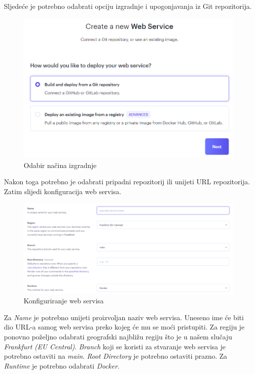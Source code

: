 			Sljedeće je potrebno odabrati opciju izgradnje i upogonjavanja iz Git repozitorija.
			
			\begin{figure}[H]
				\includegraphics[width=\textwidth]{slike/upute/odabirIzvoraIzgradnje.png} %
				\caption{Odabir načina izgradnje}
				\label{fig:odabirIzvoraIzgradnje} %
			\end{figure}
			
			Nakon toga potrebno je odabrati pripadni repozitorij ili unijeti URL repozitorija. Zatim slijedi konfiguracija web servisa.
			
			\begin{figure}[H]
				\includegraphics[width=\textwidth]{slike/upute/konfiguriranjeWebServisa.png} %
				\caption{Konfiguriranje web servisa}
				\label{fig:konfiguriranjeWebServisa} %
			\end{figure}
			
			Za \textit{Name} je potrebno unijeti proizvoljan naziv web servisa. Uneseno ime će biti dio URL-a samog web servisa preko kojeg će mu se moći pristupiti. Za regiju je ponovno poželjno odabrati geografski najbližu regiju što je u našem slučaju \textit{Frankfurt (EU Central)}. \textit{Branch} koji se koristi za stvaranje web servisa je potrebno ostaviti na \textit{main}. \textit{Root Directory} je potrebno ostaviti prazno. Za \textit{Runtime} je potrebno odabrati \textit{Docker}.
			
